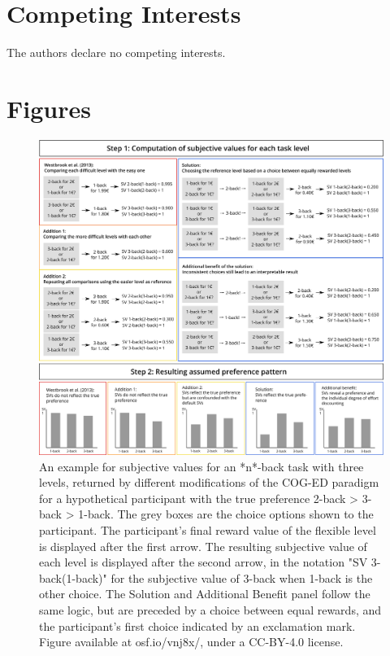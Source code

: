 \documentclass[
  man,floatsintext]{apa6}
\begin{document}
\hypertarget{competing-interests}{%
\section{Competing Interests}\label{competing-interests}}

The authors declare no competing interests.

\newpage

\hypertarget{figures}{%
\section{Figures}\label{figures}}

\begin{figure}[H]
\includegraphics[width=\textwidth]{../../Inkscape Figures/Paradigm_Scheme} \caption{An example for subjective values for an *n*-back task with three levels, returned by different modifications of the COG-ED paradigm for a hypothetical participant with the true preference 2-back > 3-back > 1-back. The grey boxes are the choice options shown to the participant. The participant's final reward value of the flexible level is displayed after the first arrow. The resulting subjective value of each level is displayed after the second arrow, in the notation "SV 3-back(1-back)" for the subjective value of 3-back when 1-back is the other choice. The Solution and Additional Benefit panel follow the same logic, but are preceded by a choice between equal rewards, and the participant's first choice indicated by an exclamation mark. Figure available at osf.io/vnj8x/, under a CC-BY-4.0 license.}\label{fig:cadparadigm}
\end{figure}
\end{document}

